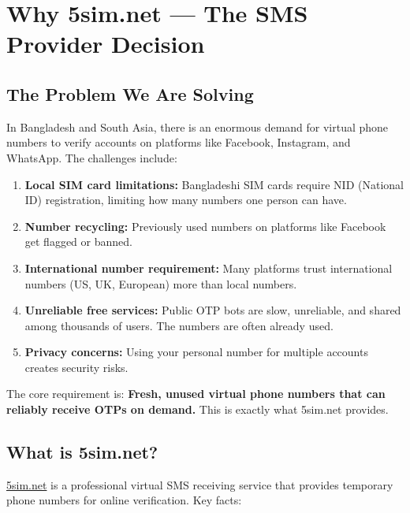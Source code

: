 
\chapter{Why 5sim.net --- The SMS Provider Decision}

\section{The Problem We Are Solving}

In Bangladesh and South Asia, there is an enormous demand for virtual phone numbers to verify accounts on platforms like Facebook, Instagram, and WhatsApp. The challenges include:

\begin{enumerate}
    \item \textbf{Local SIM card limitations:} Bangladeshi SIM cards require NID (National ID) registration, limiting how many numbers one person can have.
    \item \textbf{Number recycling:} Previously used numbers on platforms like Facebook get flagged or banned.
    \item \textbf{International number requirement:} Many platforms trust international numbers (US, UK, European) more than local numbers.
    \item \textbf{Unreliable free services:} Public OTP bots are slow, unreliable, and shared among thousands of users. The numbers are often already used.
    \item \textbf{Privacy concerns:} Using your personal number for multiple accounts creates security risks.
\end{enumerate}

\begin{importantbox}
The core requirement is: \textbf{Fresh, unused virtual phone numbers that can reliably receive OTPs on demand.} This is exactly what 5sim.net provides.
\end{importantbox}

\section{What is 5sim.net?}

\href{https://5sim.net}{5sim.net} is a professional virtual SMS receiving service that provides temporary phone numbers for online verification. Key facts:

